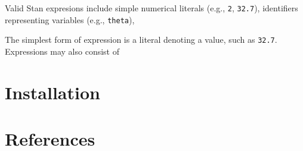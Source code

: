 \documentclass[10pt]{report}
\newcommand{\Stan}{Stan\xspace}
\newcommand{\code}[1]{{\tt #1}}
\begin{document}
Valid \Stan expresions include simple numerical literals (e.g.,
\code{2}, \code{32.7}), identifiers representing variables (e.g.,
\code{theta}), 

The simplest form of expression is a literal denoting a
value, such as \code{32.7}.  Expressions may also consist of

\appendix

\chapter{Installation}\label{install.appendix}

\chapter*{References}
\end{document}
